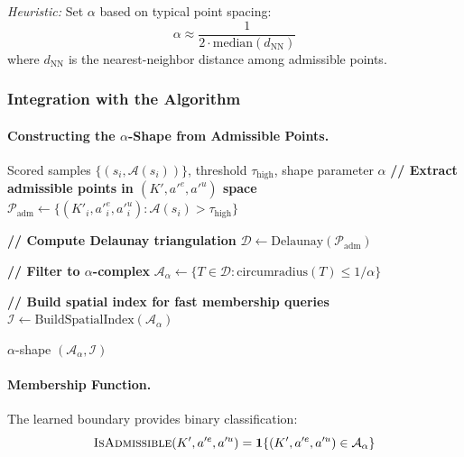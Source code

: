 \textit{Heuristic:} Set $\alpha$ based on typical point spacing:
\begin{equation}
    \alpha \approx \frac{1}{2 \cdot \text{median}(d_{\text{NN}})}
\end{equation}
where $d_{\text{NN}}$ is the nearest-neighbor distance among admissible points.


\subsubsection{Integration with the Algorithm}

\paragraph{Constructing the $\alpha$-Shape from Admissible Points.}

\begin{algorithm}[H]
\caption{$\alpha$-Shape Boundary Construction}
\label{alg:alpha_construction}
\begin{algorithmic}[1]
\Require Scored samples $\{(s_i, \mathcal{A}(s_i))\}$, threshold $\tau_{\text{high}}$, shape parameter $\alpha$
\State \textbf{// Extract admissible points in $(K', a'^e, a'^u)$ space}
\State $\mathcal{P}_{\text{adm}} \gets \{(K'_i, a'^e_i, a'^u_i) : \mathcal{A}(s_i) > \tau_{\text{high}}\}$

\State
\State \textbf{// Compute Delaunay triangulation}
\State $\mathcal{D} \gets \text{Delaunay}(\mathcal{P}_{\text{adm}})$

\State
\State \textbf{// Filter to $\alpha$-complex}
\State $\mathcal{A}_\alpha \gets \{T \in \mathcal{D} : \text{circumradius}(T) \leq 1/\alpha\}$

\State
\State \textbf{// Build spatial index for fast membership queries}
\State $\mathcal{I} \gets \text{BuildSpatialIndex}(\mathcal{A}_\alpha)$

\State \Return $\alpha$-shape $(\mathcal{A}_\alpha, \mathcal{I})$
\end{algorithmic}
\end{algorithm}

\paragraph{Membership Function.}
The learned boundary provides binary classification:
\begin{equation}
    \textsc{IsAdmissible}(K', a'^e, a'^u) = \mathbf{1}\{(K', a'^e, a'^u) \in \mathcal{A}_\alpha\}
\end{equation}

